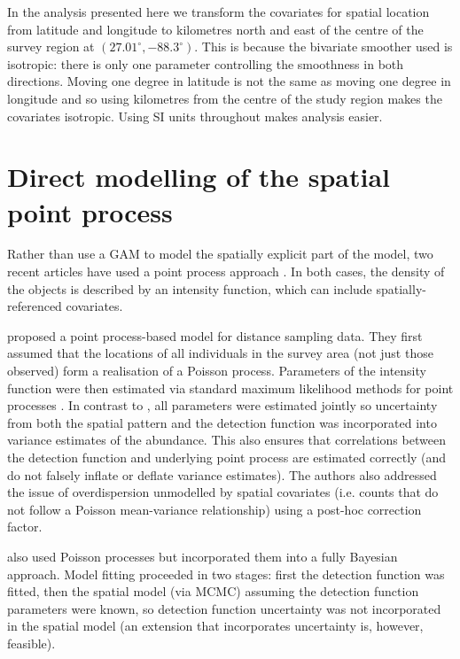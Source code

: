 \documentclass[a4paper,12pt]{article}
\begin{document}
In the analysis presented here we transform the covariates for spatial location from latitude and longitude to kilometres north and east of the centre of the survey region at $(27.01^\circ, -88.3^\circ)$. This is because the bivariate smoother used \citep[the thin plate spline;][]{Wood:2003tc} is isotropic: there is only one parameter controlling the smoothness in both directions. Moving one degree in latitude is not the same as moving one degree in longitude and so using kilometres from the centre of the study region makes the covariates isotropic. Using SI units throughout makes analysis easier.


\section*{Direct modelling of the spatial point process}
\label{s:direct}

Rather than use a GAM to model the spatially explicit part of the model, two recent articles \citep{Johnson:2010gf,Niemi:2010kx} have used a point process \citep{cox1980point} approach \citep[which was formulated by][]{Hedley:2004et}. In both cases, the density of the objects is described by an intensity function, which can include spatially-referenced covariates.

\cite{Johnson:2010gf} proposed a point process-based model for distance sampling data. They first assumed that the locations of all individuals in the survey area (not just those observed) form a realisation of a Poisson process. Parameters of the intensity function were then estimated via standard maximum likelihood methods for point processes \citep{Baddeley:2000to}. In contrast to \cite{Hedley:2004et}, all parameters were estimated jointly so uncertainty from both the spatial pattern and the detection function was incorporated into variance estimates of the abundance. This also ensures that correlations between the detection function and underlying point process are estimated correctly (and do not falsely inflate or deflate variance estimates). The authors also addressed the issue of overdispersion unmodelled by spatial covariates (i.e. counts that do not follow a Poisson mean-variance relationship) using a post-hoc correction factor.

\cite{Niemi:2010kx} also used Poisson processes but incorporated them into a fully Bayesian approach. Model fitting proceeded in two stages: first the detection function was fitted, then the spatial model (via MCMC) assuming the detection function parameters were known, so detection function uncertainty was not incorporated in the spatial model (an extension that incorporates uncertainty is, however, feasible).
\end{document}
